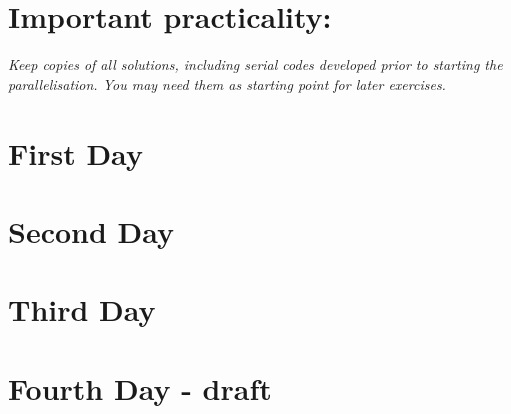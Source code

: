 \documentclass[a4paper,oneside,12pt]{article}
\begin{document}
\section*{Important practicality:}
\textit{Keep copies of all solutions, including serial codes developed prior to starting the parallelisation.  You may need them as starting point for later exercises.}

\pagebreak
\section{First Day}



\pagebreak
\section{Second Day}



\pagebreak
\section{Third Day}



\pagebreak
\section{Fourth Day - draft}


\end{document}
